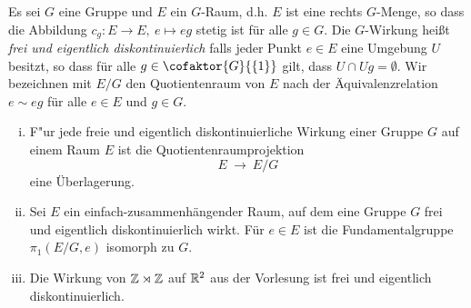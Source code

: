 \begin{aufgabe}
	Es sei $G$ eine Gruppe und $E$ ein $G$-Raum, d.h. $E$ ist eine rechts $G$-Menge, so dass die Abbildung $c_g\colon E\to E,\ e\mapsto eg$ stetig ist für alle $g\in G$. Die $G$-Wirkung heißt \emph{frei und eigentlich diskontinuierlich}
	falls jeder Punkt $e\in E$ eine Umgebung $U$ besitzt, so dass
    für alle $g\in \cofaktor{G}{\{1\}}$ gilt, dass $U\cap Ug=\emptyset$.
	Wir bezeichnen mit $E/G$ den Quotientenraum von $E$ nach
	der Äquivalenzrelation $e\sim eg$ für alle $e\in E$ und $g\in G$.	
	\begin{enumerate}[i)]
		\item F"ur jede freie und eigentlich diskontinuierliche Wirkung
		einer Gruppe $G$ auf einem Raum $E$ ist die Quotientenraumprojektion
		\[ E \ \to \ E/G \]
		eine Überlagerung. %
		\item Sei $E$ ein einfach-zusammenhängender Raum, auf dem eine Gruppe $G$ frei und eigentlich diskontinuierlich wirkt. Für $e\in E$ ist die Fundamentalgruppe $\pi_1(E/G, e)$ isomorph zu $G$. 
		\item Die Wirkung von $\mathbb Z\rtimes \mathbb Z$ auf $\mathbb{R}^2$ aus der Vorlesung ist frei und eigentlich diskontinuierlich.
	\end{enumerate}
\end{aufgabe}

